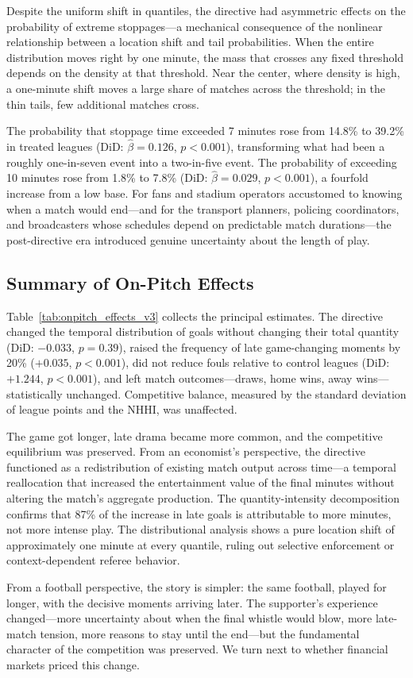 Despite the uniform shift in quantiles, the directive had asymmetric effects on the probability of extreme stoppages---a mechanical consequence of the nonlinear relationship between a location shift and tail probabilities. When the entire distribution moves right by one minute, the mass that crosses any fixed threshold depends on the density at that threshold. Near the center, where density is high, a one-minute shift moves a large share of matches across the threshold; in the thin tails, few additional matches cross.

The probability that stoppage time exceeded 7 minutes rose from 14.8\% to 39.2\% in treated leagues (DiD: $\hat{\beta} = 0.126$, $p < 0.001$), transforming what had been a roughly one-in-seven event into a two-in-five event. The probability of exceeding 10 minutes rose from 1.8\% to 7.8\% (DiD: $\hat{\beta} = 0.029$, $p < 0.001$), a fourfold increase from a low base. For fans and stadium operators accustomed to knowing when a match would end---and for the transport planners, policing coordinators, and broadcasters whose schedules depend on predictable match durations---the post-directive era introduced genuine uncertainty about the length of play.


\subsection{Summary of On-Pitch Effects}



Table~\ref{tab:onpitch_effects_v3} collects the principal estimates. The directive changed the temporal distribution of goals without changing their total quantity (DiD: $-0.033$, $p = 0.39$), raised the frequency of late game-changing moments by 20\% ($+0.035$, $p < 0.001$), did not reduce fouls relative to control leagues (DiD: $+1.244$, $p < 0.001$), and left match outcomes---draws, home wins, away wins---statistically unchanged. Competitive balance, measured by the standard deviation of league points and the NHHI, was unaffected.

The game got longer, late drama became more common, and the competitive
equilibrium was preserved. From an economist's perspective, the directive
functioned as a redistribution of existing match output across time---a temporal
reallocation that increased the entertainment value of the final minutes without
altering the match's aggregate production. The quantity-intensity decomposition
confirms that 87\% of the increase in late goals is attributable to more minutes,
not more intense play. The distributional analysis shows a pure location shift
of approximately one minute at every quantile, ruling out selective enforcement
or context-dependent referee behavior.

From a football perspective, the story is simpler: the same football, played for
longer, with the decisive moments arriving later. The supporter's experience
changed---more uncertainty about when the final whistle would blow, more
late-match tension, more reasons to stay until the end---but the fundamental
character of the competition was preserved. We turn next to whether financial
markets priced this change.
